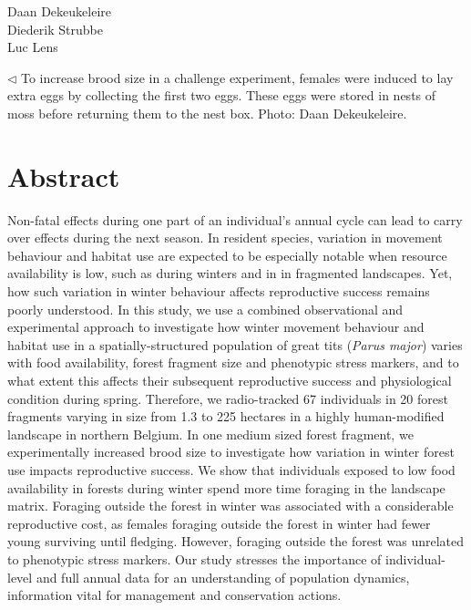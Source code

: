 \documentclass[10pt, twoside]{book} %
\begin{document}
	\begin{flushright} \color{gray} Daan Dekeukeleire\\ Diederik Strubbe\\ Luc Lens\\ 
	
\end{flushright}

\vspace*{\fill}
\noindent \color{gray} $\lhd$ To increase brood size in a challenge experiment, females were induced to lay extra eggs by collecting the first two eggs. These eggs were stored in nests of moss before returning them to the nest box. Photo: Daan Dekeukeleire.

\color{black}
\newpage
	
	
		\section{Abstract}
		
Non-fatal effects during one part of an individual's annual cycle can lead to carry over effects during the next season. In resident species, variation in movement behaviour and habitat use are expected to be especially notable when resource availability is low, such as during winters and in in fragmented landscapes. Yet, how such variation in winter behaviour affects reproductive success remains poorly understood. In this study, we use a combined observational and experimental approach to investigate how winter movement behaviour and habitat use in a spatially-structured population of great tits (\textit{Parus major}) varies with food availability, forest fragment size and phenotypic stress markers, and to what extent this affects their subsequent reproductive success and physiological condition during spring. Therefore, we radio-tracked 67 individuals in 20 forest fragments varying in size from 1.3 to 225 hectares in a highly human-modified landscape in northern Belgium. In one medium sized forest fragment, we experimentally increased brood size to investigate how variation in winter forest use impacts reproductive success. We show that individuals exposed to low food availability in forests during winter spend more time foraging in the landscape matrix. Foraging outside the forest in winter was associated with a considerable reproductive cost, as females foraging outside the forest in winter had fewer young surviving until fledging. However, foraging outside the forest was unrelated to phenotypic stress markers. Our study stresses the importance of individual-level and full annual data for an understanding of population dynamics, information vital for management and conservation actions. 		
		
\end{document}
